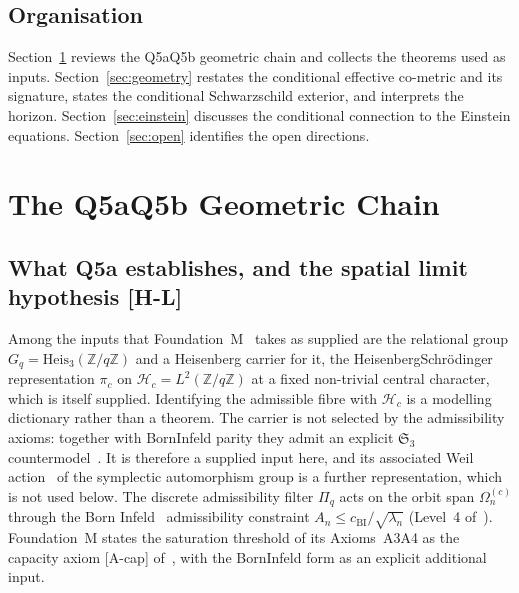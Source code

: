 \documentclass[11pt,a4paper]{article}
\begin{document}
  \subsection*{Organisation}

    Section~\ref{sec:continuum} reviews the Q5a\textendash Q5b geometric chain and collects the theorems used as
    inputs.
    Section~\ref{sec:geometry} restates the conditional effective co-metric and its signature, states the
    conditional Schwarzschild exterior, and interprets the horizon.
    Section~\ref{sec:einstein} discusses the conditional connection to the Einstein equations.
    Section~\ref{sec:open} identifies the open directions.

  \section{The Q5a\textendash Q5b Geometric Chain}
  \label{sec:continuum}

  \subsection{What Q5a establishes, and the spatial limit hypothesis [H-L]}
    \label{sec:q5a}

    Among the inputs that Foundation~M~\cite{Beau2026m} takes as supplied are the relational group
    $G_q = \mathrm{Heis}_3(\mathbb{Z}/q\mathbb{Z})$ and a Heisenberg carrier for it, the
    Heisenberg\textendash Schr\"odinger representation $\pi_c$ on $\mathcal{H}_c = L^2(\mathbb{Z}/q\mathbb{Z})$ at a
    fixed non-trivial central character, which is itself supplied.
    Identifying the admissible fibre with $\mathcal{H}_c$ is a modelling dictionary rather than a theorem.
    The carrier is not selected by the admissibility axioms: together with Born\textendash Infeld parity they admit an
    explicit $\mathfrak{S}_3$ countermodel~\cite{Beau2026m,Beau2026HeisenbergStructure}.
    It is therefore a supplied input here, and its associated Weil action~\cite{Weil1964} of the symplectic automorphism
    group is a further representation, which is not used below.
    The discrete admissibility filter $\Pi_q$ acts on the orbit span $\Omega_n^{(c)}$ through the Born\textendash
    Infeld~\cite{BornInfeld1934} admissibility constraint $A_n \leq c_{\mathrm{BI}}/\sqrt{\lambda_n}$ (Level~4
    of~\cite{Beau2026m}).
    Foundation~M states the saturation threshold of its Axioms~A3\textendash A4 as the capacity axiom [A-cap]
    of~\cite{Beau2026c}, with the Born\textendash Infeld form as an explicit additional input.
\end{document}
